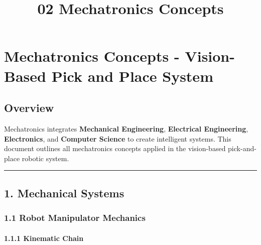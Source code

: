 \documentclass[
]{article}
\title{02 Mechatronics Concepts}
\author{}
\date{}
\begin{document}
\maketitle

{
\setcounter{tocdepth}{3}
\tableofcontents
}
\hypertarget{mechatronics-concepts---vision-based-pick-and-place-system}{%
\section{Mechatronics Concepts - Vision-Based Pick and Place
System}\label{mechatronics-concepts---vision-based-pick-and-place-system}}

\hypertarget{overview}{%
\subsection{Overview}\label{overview}}

Mechatronics integrates \textbf{Mechanical Engineering},
\textbf{Electrical Engineering}, \textbf{Electronics}, and
\textbf{Computer Science} to create intelligent systems. This document
outlines all mechatronics concepts applied in the vision-based
pick-and-place robotic system.

\begin{center}\rule{0.5\linewidth}{0.5pt}\end{center}

\hypertarget{mechanical-systems}{%
\subsection{1. Mechanical Systems}\label{mechanical-systems}}

\hypertarget{robot-manipulator-mechanics}{%
\subsubsection{1.1 Robot Manipulator
Mechanics}\label{robot-manipulator-mechanics}}

\hypertarget{kinematic-chain}{%
\paragraph{1.1.1 Kinematic Chain}\label{kinematic-chain}}
\end{document}
